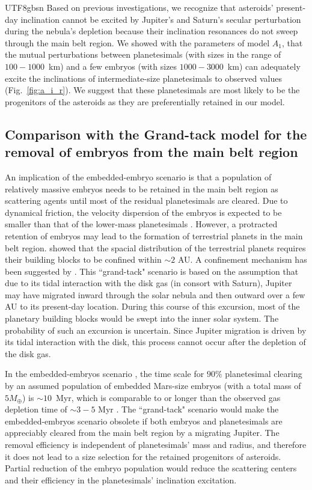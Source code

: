\documentclass[tighten]{aastex6}
\begin{document}
\begin{CJK*}{UTF8}{gbsn}
Based on previous investigations\citep{heppenheimer1980, ward1981, 
nagasawa2000}, we recognize that asteroids' present-day inclination
cannot be excited by Jupiter's and Saturn's secular perturbation 
during the nebula's depletion because their inclination resonances 
do not sweep through the main belt region.  We showed with the parameters
of model $A_1$, that the mutual perturbations between planetesimals 
(with sizes in the range of $100-1000$~km) and a few embryos 
(with sizes $1000-3000$~km) can adequately excite the inclinations 
of intermediate-size planetesimals to observed values (Fig.~\ref{fig:a_i_r}).
We suggest that these planetesimals are most likely to be the progenitors of 
the asteroids as they are preferentially retained in our model.  


\subsection{Comparison with the Grand-tack model for 
the removal of embryos from the main belt region}

An implication of the embedded-embryo scenario is that 
a population of relatively massive embryos needs to be retained 
in the main belt region as scattering agents until most of the 
residual planetesimals are cleared. Due to dynamical friction, the 
velocity dispersion of the embryos is expected to be smaller than 
that of the lower-mass planetesimals \citep{wetherillstewart1989, 
palmer1993}.  However, a protracted retention of embryos may 
lead to the formation of terrestrial planets in the main belt
region. \cite{hansen2009} showed that the spacial distribution 
of the terrestrial planets requires their building blocks to 
be confined within $\sim 2$ AU.  A confinement mechanism has 
been suggested by \cite{walsh2011}.  This ``grand-tack" 
scenario is based on the assumption that due to its tidal
interaction with the disk gas (in consort with Saturn), Jupiter may 
have migrated inward through the solar nebula and then outward over 
a few AU to its present-day location.  During this course
of this excursion, most of the planetary building blocks would
be swept into the inner solar system.  The probability of such an
excursion is uncertain. Since Jupiter migration is driven by its
tidal interaction with the disk, this process cannot occur after 
the depletion of the disk gas.  

In the embedded-embryos scenario \citep{obrien2007}, the time 
scale for $90\%$ planetesimal clearing by an assumed population of 
embedded Mars-size embryos (with a total mass of $5 M_\oplus$) 
is $\sim 10$~Myr, which is comparable to or longer than the observed 
gas depletion time of $\sim 3-5$ Myr \citep{hartmann1998}. The  
``grand-tack" scenario would make the embedded-embryos scenario 
obsolete if both embryos and planetesimals are appreciably cleared 
from the main belt region by a migrating Jupiter. The removal
efficiency is independent of planetesimals' mass and radius, and 
therefore it does not lead to a size selection for the retained 
progenitors of asteroids.  Partial reduction
of the embryo population would reduce the scattering centers and 
their efficiency in the planetesimals' inclination excitation.  


\end{CJK*}
\end{document}
